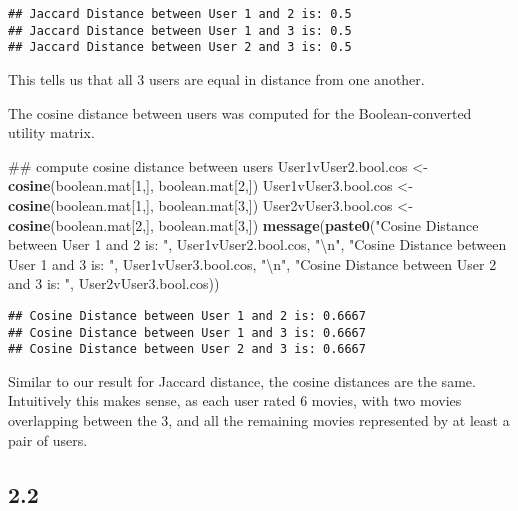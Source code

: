 \documentclass[]{article}
\newenvironment{Shaded}{\begin{snugshade}}{\end{snugshade}}
\newcommand{\KeywordTok}[1]{\textcolor[rgb]{0.13,0.29,0.53}{\textbf{{#1}}}}
\newcommand{\DecValTok}[1]{\textcolor[rgb]{0.00,0.00,0.81}{{#1}}}
\newcommand{\CharTok}[1]{\textcolor[rgb]{0.31,0.60,0.02}{{#1}}}
\newcommand{\StringTok}[1]{\textcolor[rgb]{0.31,0.60,0.02}{{#1}}}
\newcommand{\NormalTok}[1]{{#1}}
\begin{document}
\begin{verbatim}
## Jaccard Distance between User 1 and 2 is: 0.5
## Jaccard Distance between User 1 and 3 is: 0.5
## Jaccard Distance between User 2 and 3 is: 0.5
\end{verbatim}

This tells us that all 3 users are equal in distance from one another.

The cosine distance between users was computed for the Boolean-converted
utility matrix.

\begin{Shaded}
\begin{Highlighting}[]
\NormalTok{## compute cosine distance between users}
\NormalTok{User1vUser2.bool.cos <-}\StringTok{ }\KeywordTok{cosine}\NormalTok{(boolean.mat[}\DecValTok{1}\NormalTok{,], boolean.mat[}\DecValTok{2}\NormalTok{,])}
\NormalTok{User1vUser3.bool.cos <-}\StringTok{ }\KeywordTok{cosine}\NormalTok{(boolean.mat[}\DecValTok{1}\NormalTok{,], boolean.mat[}\DecValTok{3}\NormalTok{,])}
\NormalTok{User2vUser3.bool.cos <-}\StringTok{ }\KeywordTok{cosine}\NormalTok{(boolean.mat[}\DecValTok{2}\NormalTok{,], boolean.mat[}\DecValTok{3}\NormalTok{,])}
\KeywordTok{message}\NormalTok{(}\KeywordTok{paste0}\NormalTok{(}\StringTok{"Cosine Distance between User 1 and 2 is: "}\NormalTok{, User1vUser2.bool.cos, }\StringTok{"}\CharTok{\textbackslash{}n}\StringTok{"}\NormalTok{,}
               \StringTok{"Cosine Distance between User 1 and 3 is: "}\NormalTok{, User1vUser3.bool.cos, }\StringTok{"}\CharTok{\textbackslash{}n}\StringTok{"}\NormalTok{,}
               \StringTok{"Cosine Distance between User 2 and 3 is: "}\NormalTok{, User2vUser3.bool.cos)) }
\end{Highlighting}
\end{Shaded}

\begin{verbatim}
## Cosine Distance between User 1 and 2 is: 0.6667
## Cosine Distance between User 1 and 3 is: 0.6667
## Cosine Distance between User 2 and 3 is: 0.6667
\end{verbatim}

Similar to our result for Jaccard distance, the cosine distances are the
same. Intuitively this makes sense, as each user rated 6 movies, with
two movies overlapping between the 3, and all the remaining movies
represented by at least a pair of users.

\subsection{2.2}\label{section-1}
\end{document}
